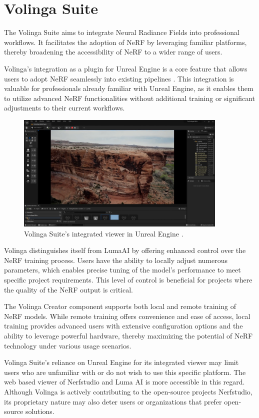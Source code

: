 \section{Volinga Suite}

The Volinga Suite \cite{noauthor_volinga_nodate} aims to integrate Neural Radiance Fields into professional workflows.
It facilitates the adoption of NeRF by leveraging familiar platforms, thereby broadening the accessibility of NeRF to a wider range of users.

Volinga's integration as a plugin for Unreal Engine \cite{noauthor_unreal_nodate} is a core feature that allows users to adopt NeRF seamlessly into existing pipelines .
This integration is valuable for professionals already familiar with Unreal Engine, as it enables them to utilize advanced NeRF functionalities without additional training or significant adjustments to their current workflows.

\begin{figure}[h!]
  \centering
  \includegraphics[width=0.9\textwidth]{figures/related-volinga.png}
  \caption{Volinga Suite's integrated viewer in Unreal Engine \cite{noauthor_volinga_nodate}.}
  \label{fig:volinga-viewer}
\end{figure}

Volinga distinguishes itself from LumaAI by offering enhanced control over the NeRF training process.
Users have the ability to locally adjust numerous parameters, which enables precise tuning of the model's performance to meet specific project requirements.
This level of control is beneficial for projects where the quality of the NeRF output is critical.

The Volinga Creator component supports both local and remote training of NeRF models.
While remote training offers convenience and ease of access, local training provides advanced users with extensive configuration options and the ability to leverage powerful hardware, thereby maximizing the potential of NeRF technology under various usage scenarios.

Volinga Suite's reliance on Unreal Engine for its integrated viewer may limit users who are unfamiliar with or do not wish to use this specific platform.
The web based viewer of Nerfstudio and Luma AI is more accessible in this regard.
Although Volinga is actively contributing to the open-source projects Nerfstudio, its proprietary nature may also deter users or organizations that prefer open-source solutions.
